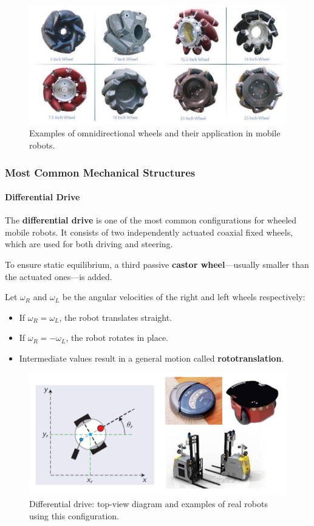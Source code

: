 \begin{figure}[H]
  \centering
  \includegraphics[width=\linewidth]{imgs/omnidirectional_wheels.png}
  \caption{Examples of omnidirectional wheels and their application in mobile robots.}
\end{figure}

\subsubsection*{Most Common Mechanical Structures}

\paragraph{Differential Drive} \hfill

The \textbf{differential drive} is one of the most common configurations for wheeled mobile robots. It consists of two independently actuated coaxial fixed wheels, which are used for both driving and steering.

To ensure static equilibrium, a third passive \textbf{castor wheel}—usually smaller than the actuated ones—is added.

Let $\omega_R$ and $\omega_L$ be the angular velocities of the right and left wheels respectively:
\begin{itemize}
  \item If $\omega_R = \omega_L$, the robot translates straight.
  \item If $\omega_R = -\omega_L$, the robot rotates in place.
  \item Intermediate values result in a general motion called \textbf{rototranslation}.
\end{itemize}

\begin{figure}[H]
  \centering
  \includegraphics[width=0.8\linewidth]{imgs/differential_drive.png}
  \caption{Differential drive: top-view diagram and examples of real robots using this configuration.}
\end{figure}

